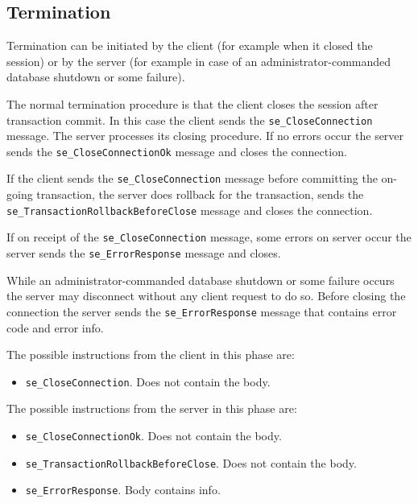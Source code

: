 \documentclass[a4paper,12pt]{article}
\newenvironment{citemize}
{\begin{itemize}
  \setlength{\itemsep}{0pt}
  \setlength{\parskip}{0pt}
  \setlength{\parsep}{0pt}}
{\end{itemize}}
\begin{document}
\subsection{Termination}

Termination can be initiated by the client (for example when it closed the
session) or by the server (for example in case of an administrator-commanded
database shutdown or some failure).

The normal termination procedure is that the client closes the session after
transaction commit. In this case the client sends the \verb!se_CloseConnection!
message. The server processes its closing procedure. If no errors occur the
server sends the \verb!se_CloseConnectionOk! message and closes the connection.

If the client sends the \verb!se_CloseConnection! message before committing the
on-going transaction, the server does rollback for the transaction, sends the
\verb!se_TransactionRollbackBeforeClose! message and closes the connection.

If on receipt of the \verb!se_CloseConnection! message, some errors on server
occur the server sends the \verb!se_ErrorResponse! message and closes.

While an administrator-commanded database shutdown or some failure occurs the
server may disconnect without any client request to do so. Before closing the
connection the server sends the \verb!se_ErrorResponse! message that contains
error code and error info.

The possible instructions from the client in this phase are:
\begin{citemize}
\item \verb!se_CloseConnection!. Does not contain the body.
\end{citemize}

The possible instructions from the server in this phase are:
\begin{citemize}
\item \verb!se_CloseConnectionOk!. Does not contain the body.
\item \verb!se_TransactionRollbackBeforeClose!. Does not contain the body.
\item \verb!se_ErrorResponse!. Body contains info.
\end{citemize}


\end{document}
